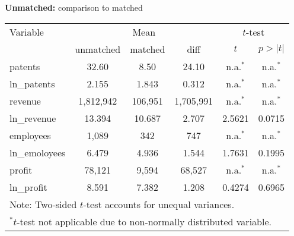 \documentclass{beamer} %
\begin{document}
\begin{frame}[label=unmatched]{\textbf{Unmatched:} comparison to matched}
	\begin{table}[b!]
	\centering
	\begin{tabular}{lccccc}
		\midrule
		Variable & \multicolumn{3}{c}{Mean} & \multicolumn{2}{c}{$t$-test} \\
		& \multicolumn{1}{c}{unmatched} & \multicolumn{1}{c}{matched} & \multicolumn{1}{c}{diff} & \multicolumn{1}{c}{$t$} & \multicolumn{1}{c}{$p>|t|$} \\
		\midrule
		patents & \multicolumn{1}{c}{32.60} & \multicolumn{1}{c}{8.50} & \multicolumn{1}{c}{24.10} & \multicolumn{1}{c}{n.a.$^*$} & \multicolumn{1}{c}{n.a.$^*$} \\
		ln\_patents & \multicolumn{1}{c}{2.155} & \multicolumn{1}{c}{1.843} & \multicolumn{1}{c}{0.312} & \multicolumn{1}{c}{n.a.$^*$} & \multicolumn{1}{c}{n.a.$^*$} \\
		\midrule
		revenue & \multicolumn{1}{c}{1,812,942} & \multicolumn{1}{c}{106,951} & \multicolumn{1}{c}{1,705,991} & \multicolumn{1}{c}{n.a.$^*$} & \multicolumn{1}{c}{n.a.$^*$} \\
		ln\_revenue & \multicolumn{1}{c}{13.394} & \multicolumn{1}{c}{10.687} & \multicolumn{1}{c}{2.707} & \multicolumn{1}{c}{2.5621} & \multicolumn{1}{c}{0.0715} \\
		\midrule
		employees & \multicolumn{1}{c}{1,089} & \multicolumn{1}{c}{342} & \multicolumn{1}{c}{747} & \multicolumn{1}{c}{n.a.$^*$} & \multicolumn{1}{c}{n.a.$^*$} \\
		ln\_emoloyees & \multicolumn{1}{c}{6.479} & \multicolumn{1}{c}{4.936} & \multicolumn{1}{c}{1.544} & \multicolumn{1}{c}{1.7631} & \multicolumn{1}{c}{0.1995} \\
		\midrule
		profit & \multicolumn{1}{c}{78,121} & \multicolumn{1}{c}{9,594} & \multicolumn{1}{c}{68,527} & \multicolumn{1}{c}{n.a.$^*$} & \multicolumn{1}{c}{n.a.$^*$} \\
		ln\_profit & \multicolumn{1}{c}{8.591} & \multicolumn{1}{c}{7.382} & \multicolumn{1}{c}{1.208} & \multicolumn{1}{c}{0.4274} & \multicolumn{1}{c}{0.6965} \\
		\midrule
		\multicolumn{6}{l}{\footnotesize{Note: Two-sided $t$-test accounts for unequal variances.}} \\
		\multicolumn{6}{l}{\footnotesize{$^*$$t$-test not applicable due to non-normally distributed variable.}}
	\end{tabular}%
	\label{tab:des_unmatched_non-hic}%
    \end{table}%
\end{frame}
\end{document}

